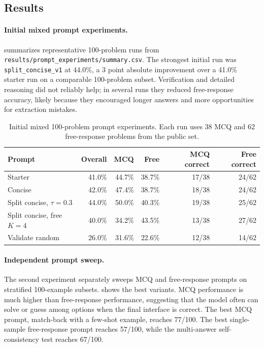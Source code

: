 \documentclass{article}
\begin{document}
\subsection{Results}
\label{sec:results}

\paragraph{Initial mixed prompt experiments.}
 summarizes representative 100-problem runs from \texttt{results/prompt\_experiments/summary.csv}. The strongest initial run was \texttt{split\_concise\_v1} at 44.0\%, a 3 point absolute improvement over a 41.0\% starter run on a comparable 100-problem subset. Verification and detailed reasoning did not reliably help; in several runs they reduced free-response accuracy, likely because they encouraged longer answers and more opportunities for extraction mistakes.

\begin{table}[H]
\caption{Initial mixed 100-problem prompt experiments. Each run uses 38 MCQ and 62 free-response problems from the public set.}
\label{tab:mixed-prompts}
\centering
\begin{tabular}{lrrrrr}
\toprule
Prompt & Overall & MCQ & Free & MCQ correct & Free correct \\
\midrule
Starter & 41.0\% & 44.7\% & 38.7\% & 17/38 & 24/62 \\
Concise & 42.0\% & 47.4\% & 38.7\% & 18/38 & 24/62 \\
Split concise, $\tau=0.3$ & 44.0\% & 50.0\% & 40.3\% & 19/38 & 25/62 \\
Split concise, free $K=4$ & 40.0\% & 34.2\% & 43.5\% & 13/38 & 27/62 \\
Validate random & 26.0\% & 31.6\% & 22.6\% & 12/38 & 14/62 \\
\bottomrule
\end{tabular}
\end{table}

\paragraph{Independent prompt sweep.}
The second experiment separately sweeps MCQ and free-response prompts on stratified 100-example subsets.  shows the best variants. MCQ performance is much higher than free-response performance, suggesting that the model often can solve or guess among options when the final interface is correct. The best MCQ prompt, match-back with a few-shot example, reaches 77/100. The best single-sample free-response prompt reaches 57/100, while the multi-answer self-consistency test reaches 67/100.
\end{document}
